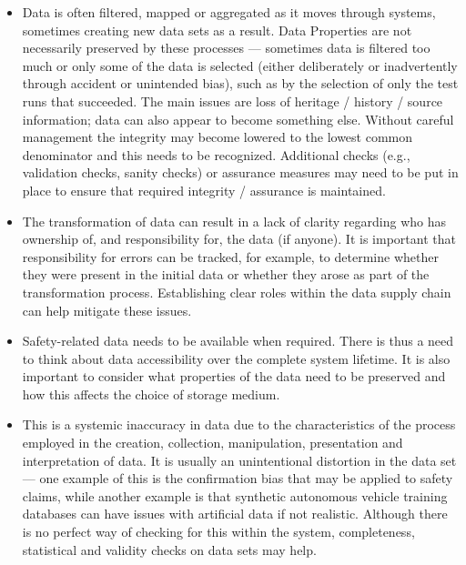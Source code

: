 \begin{itemize}
  \item {} Data is often filtered, mapped or aggregated as it moves through systems, sometimes creating new data sets as a result. Data Properties are not necessarily preserved by these processes --- sometimes data is filtered too much or only some of the data is selected (either deliberately or inadvertently through accident or unintended bias), such as by the selection of only the test runs that succeeded. The main issues are loss of heritage / history / source information; data can also appear to become something else. Without careful management the integrity may become lowered to the lowest common denominator and this needs to be recognized. Additional checks (e.g., validation checks, sanity checks) or assurance measures may need to be put in place to ensure that required integrity / assurance is maintained.

  \item {} The transformation of data can result in a lack of clarity regarding who has ownership of, and responsibility for, the data (if anyone). It is important that responsibility for errors can be tracked, for example, to determine whether they were present in the initial data or whether they arose as part of the transformation process. Establishing clear roles within the data supply chain can help mitigate these issues.

  \item {} Safety-related data needs to be available when required. There is thus a need to think about data accessibility over the complete system lifetime. It is also important to consider what properties of the data need to be preserved and how this affects the choice of storage medium.

  \item {} This is a systemic inaccuracy in data due to the characteristics of the process employed in the creation, collection, manipulation, presentation and interpretation of data. It is usually an unintentional distortion in the data set --- one example of this is the confirmation bias that may be applied to safety claims,
    while another example is that synthetic autonomous vehicle training databases can have issues with artificial data if not realistic.
    Although there is no perfect way of checking for this within the system, completeness, statistical and validity checks on data sets may help.


\end{itemize}

